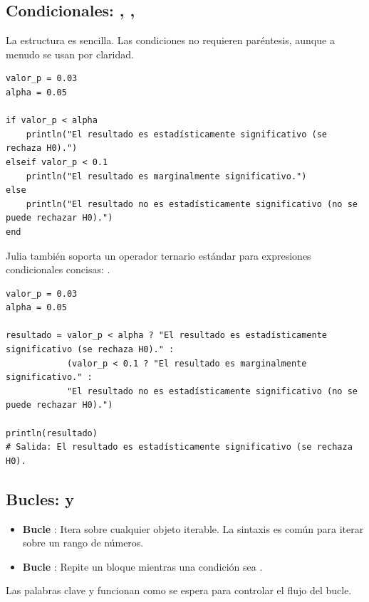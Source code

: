 \subsection*{Condicionales: , , }
La estructura es sencilla. Las condiciones no requieren paréntesis, aunque a menudo se usan por claridad.

\text{ }\begin{verbatim}
valor_p = 0.03
alpha = 0.05

if valor_p < alpha
    println("El resultado es estadísticamente significativo (se rechaza H0).")
elseif valor_p < 0.1
    println("El resultado es marginalmente significativo.")
else
    println("El resultado no es estadísticamente significativo (no se puede rechazar H0).")
end
\end{verbatim}
Julia también soporta un operador ternario estándar para expresiones condicionales concisas: .

\begin{verbatim}
valor_p = 0.03
alpha = 0.05

resultado = valor_p < alpha ? "El resultado es estadísticamente significativo (se rechaza H0)." :
            (valor_p < 0.1 ? "El resultado es marginalmente significativo." :
            "El resultado no es estadísticamente significativo (no se puede rechazar H0).")

println(resultado)
# Salida: El resultado es estadísticamente significativo (se rechaza H0).
\end{verbatim}

\subsection*{Bucles:  y }
\begin{itemize}
    \item \textbf{Bucle }: Itera sobre cualquier objeto iterable. La sintaxis  es común para iterar sobre un rango de números.
    \item \textbf{Bucle }: Repite un bloque mientras una condición sea .
\end{itemize}
Las palabras clave  y  funcionan como se espera para controlar el flujo del bucle.

